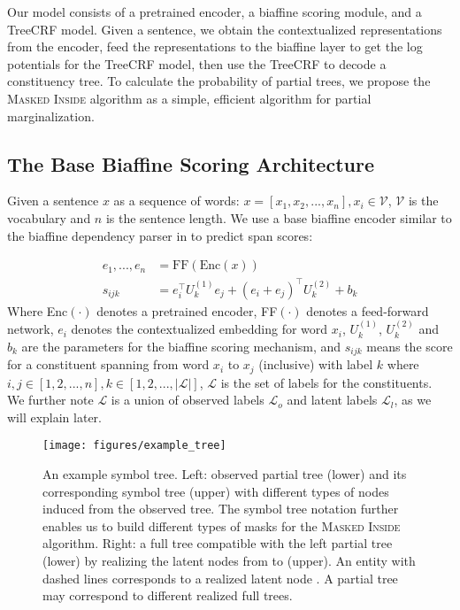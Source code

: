 	


Our model consists of a pretrained encoder, a biaffine scoring module, and a TreeCRF model. 
Given a sentence, we obtain the contextualized representations from the encoder, feed the representations to the biaffine layer to get the log potentials for the TreeCRF model, then use the TreeCRF to decode a constituency tree. 
To calculate the probability of partial trees, we propose the \textsc{Masked Inside} algorithm as a simple, efficient algorithm for partial marginalization. 


\subsection{The Base Biaffine Scoring Architecture}
\label{ssec:base_biaffine}
Given a sentence $x$ as a sequence of words: $x = [x_1, x_2, ..., x_n], x_i \in \mathcal{V}$, $\mathcal{V}$ is the vocabulary and $n$ is the  sentence length. 
We use a base biaffine encoder similar to the biaffine dependency parser in \citet{Dozat2017DeepBA} to predict span scores: 

\begin{align}
  e_1, ..., e_n &= \text{FF}(\text{Enc}(x)) \\ 
  s_{ijk} &= e_i^\intercal U_k^{(1)} e_j + (e_i + e_j)^\intercal U_k^{(2)} + b_k \label{eq:biaffine}
\end{align} 
Where Enc$(\cdot)$ denotes a pretrained encoder, FF$(\cdot)$ denotes a feed-forward network, $e_i$ denotes the contextualized embedding for word $x_i$, $U_k^{(1)}$, $U_k^{(2)}$ and $b_k$ are the parameters for the biaffine scoring mechanism, and $s_{ijk}$ means the score for a constituent spanning from word $x_i$ to $x_j$ (inclusive) with label $k$ where
$i, j \in [1, 2, ..., n], k \in [1, 2, ..., |\mathcal{L}|]$, $\mathcal{L}$ is the set of labels for the constituents. 
We further note $\mathcal{L}$ is a union of observed labels $\mathcal{L}_o$ and latent labels $\mathcal{L}_l$, as we will explain later.

\begin{figure}
  \begin{center}		
    \texttt{[image: figures/example\_tree]}
  \end{center}	
  \caption{\label{fig:example_tree} An example symbol tree.
  Left: observed partial tree (lower) and its corresponding symbol tree (upper) with different types of nodes induced from the observed tree.
  The symbol tree notation further enables us to build different types of masks for the \textsc{Masked Inside} algorithm. 
  Right: a full tree compatible with the left partial tree (lower) by realizing the latent nodes from \scalebox{0.8}{$\square$} to \scalebox{0.8}{$\blacksquare$} (upper). 
  An entity with dashed lines corresponds to a realized latent node \scalebox{0.8}{$\blacksquare$}. 
  A partial tree may correspond to different realized full trees. 
  }
\end{figure} 

